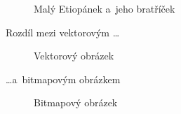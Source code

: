 \documentclass[a4paper, 11pt]{article}
\begin{document}
\begin{figure}[h]
{	}
	\caption{Malý Etiopánek a~jeho bratříček}\label{img:chlapec}
	
	\end{figure}
	\bigskip
	Rozdíl mezi vektorovým \dots\par
	\begin{figure}[h]
	\centering
	\caption{Vektorový obrázek}\label{img:vektor}
	\end{figure}
	\noindent \dots a~bitmapovým obrázkem
	\begin{figure}[h]
	\centering
	\caption{Bitmapový obrázek}\label{img:bitmap}
	\end{figure}
	
\end{document}
